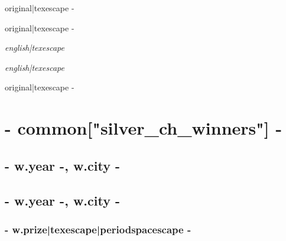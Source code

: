 {%

{%
{%
{\large {{ original|texescape -}} } 
{%
{%
\begin{addmargin}[-0.05em]{0em}{\large {{ original|texescape -}} }\end{addmargin}{\itshape {{ english|texescape }} }
{%
\begin{addmargin}[-0.05em]{0em}{\large{ } }\end{addmargin}{\itshape {{ english|texescape }} }
{%
{\large{ {{ original|texescape -}} } } 
{%
{%
{%

{%
{%
{%
{%
{%
{%
{%
{%
{%
{%

{%
\chapter*{ {{- common["silver_ch_winners"] -}} }
\thispagestyle{empty}
{%
{%
    \section*{ {{- w.year -}}, {{ w.city -}} }
{%
    \section*{ {{- w.year -}}, {{ w.city -}} }
{%
{%
    {%
        \subsection*{ {{- w.prize|texescape|periodspacescape -}} }
    {%
}}}}}}}}}}}}}}}}}}}}}}}}}}}}
